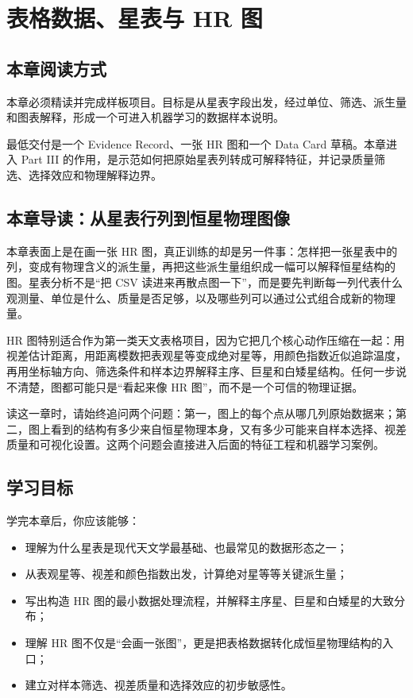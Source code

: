 \chapter{表格数据、星表与 HR 图}

\section{本章阅读方式}

本章必须精读并完成样板项目。目标是从星表字段出发，经过单位、筛选、派生量和图表解释，形成一个可进入机器学习的数据样本说明。

最低交付是一个 Evidence Record、一张 HR 图和一个 Data Card 草稿。本章进入 Part III 的作用，是示范如何把原始星表列转成可解释特征，并记录质量筛选、选择效应和物理解释边界。

\section{本章导读：从星表行列到恒星物理图像}

本章表面上是在画一张 HR 图，真正训练的却是另一件事：怎样把一张星表中的列，变成有物理含义的派生量，再把这些派生量组织成一幅可以解释恒星结构的图。星表分析不是“把 CSV 读进来再散点图一下”，而是要先判断每一列代表什么观测量、单位是什么、质量是否足够，以及哪些列可以通过公式组合成新的物理量。

HR 图特别适合作为第一类天文表格项目，因为它把几个核心动作压缩在一起：用视差估计距离，用距离模数把表观星等变成绝对星等，用颜色指数近似追踪温度，再用坐标轴方向、筛选条件和样本边界解释主序、巨星和白矮星结构。任何一步说不清楚，图都可能只是“看起来像 HR 图”，而不是一个可信的物理证据。

读这一章时，请始终追问两个问题：第一，图上的每个点从哪几列原始数据来；第二，图上看到的结构有多少来自恒星物理本身，又有多少可能来自样本选择、视差质量和可视化设置。这两个问题会直接进入后面的特征工程和机器学习案例。

\section{学习目标}

学完本章后，你应该能够：

\begin{itemize}
    \item 理解为什么星表是现代天文学最基础、也最常见的数据形态之一；
    \item 从表观星等、视差和颜色指数出发，计算绝对星等等关键派生量；
    \item 写出构造 HR 图的最小数据处理流程，并解释主序星、巨星和白矮星的大致分布；
    \item 理解 HR 图不仅是“会画一张图”，更是把表格数据转化成恒星物理结构的入口；
    \item 建立对样本筛选、视差质量和选择效应的初步敏感性。
\end{itemize}

